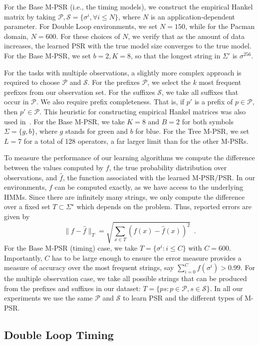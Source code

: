 \documentclass[letterpaper]{article}
\newcommand{\sstar}{\Sigma^\star}
\newcommand{\Ps}{\mathcal{P}}
\newcommand{\Ss}{\mathcal{S}}
\begin{document}
For the Base M-PSR (i.e., the timing models), we construct the empirical Hankel matrix by taking $\Ps, \Ss = \{\sigma^i, \forall i \leq N\}$, where $N$ is an application-dependent parameter. For Double Loop environments, we set $N = 150$, while for the Pacman domain, $N = 600$. For these choices of $N$, we verify that as the amount of data increases, the learned PSR with the true model size converges to the true model. For the Base M-PSR, we set $b=2, K=8$, so that the longest string in $\Sigma'$ is $\sigma^{256}$.

For the tasks with multiple observations, a slightly more complex approach is required to choose $\Ps$ and $\Ss$. For the prefixes $\Ps$, we select the $k$ most frequent prefixes from our observation set. For the suffixes $\Ss$, we take all suffixes that occur in $\Ps$. We also require prefix completeness. That is, if $p'$ is a prefix of $p \in \Ps$, then $p' \in \Ps$. This heuristic for constructing empirical Hankel matrices was also used in~\cite{icml12}. For the Base M-PSR, we take $K=8$ and $B=2$ for both symbols $\Sigma=\{g,b\}$, where $g$ stands for green and $b$ for blue. For the Tree M-PSR, we set $L=7$ for a total of 128 operators, a far larger limit  than for the other M-PSRs. 

To measure the performance of our learning algorithms we compute the difference between the values computed by $f$, the true probability distribution over observations, and $\hat{f}$, the function associated with the learned M-PSR/PSR. In our environments, $f$ can be computed exactly, as we have access to the underlying HMMs. Since there are infinitely many strings, we only compute the difference over a fixed set $T \subset \sstar$ which depends on the problem. Thus, reported errors are given by
\begin{equation*}
\|f - \hat{f}\|_T = \sqrt{\sum_{x \in T}(f(x) - \hat{f}(x))^2} \enspace.
\end{equation*}
For the Base M-PSR (timing) case, we take $T = \{\sigma^i : i \leq C\}$ with $C=600$. Importantly, $C$ has to be  large enough to ensure the error measure provides a measure of accuracy over the most frequent strings, say $\sum_{i=0}^{C} f(\sigma^i)>0.99$. For the multiple observation case, we take all possible strings that can be produced from the prefixes and suffixes in our dataset: $T = \{ps : p \in \Ps, s \in \Ss\}$. In all our experiments we use the same $\Ps$ and $\Ss$ to learn PSR and the different types of M-PSR.

\subsection{Double Loop Timing}
\end{document}
